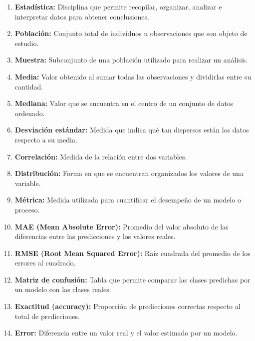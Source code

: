 \begin{enumerate}
  \item \textbf{Estadística:} Disciplina que permite recopilar, organizar, analizar e interpretar datos para obtener conclusiones.
  \item \textbf{Población:} Conjunto total de individuos u observaciones que son objeto de estudio.
  \item \textbf{Muestra:} Subconjunto de una población utilizado para realizar un análisis.
  \item \textbf{Media:} Valor obtenido al sumar todas las observaciones y dividirlas entre su cantidad.
  \item \textbf{Mediana:} Valor que se encuentra en el centro de un conjunto de datos ordenado.
  \item \textbf{Desviación estándar:} Medida que indica qué tan dispersos están los datos respecto a su media.
  \item \textbf{Correlación:} Medida de la relación entre dos variables.
  \item \textbf{Distribución:} Forma en que se encuentran organizados los valores de una variable.
  \item \textbf{Métrica:} Medida utilizada para cuantificar el desempeño de un modelo o proceso.
  \item \textbf{MAE (Mean Absolute Error):} Promedio del valor absoluto de las diferencias entre las predicciones y los valores reales.
  \item \textbf{RMSE (Root Mean Squared Error):} Raíz cuadrada del promedio de los errores al cuadrado.
  \item \textbf{Matriz de confusión:} Tabla que permite comparar las clases predichas por un modelo con las clases reales.
  \item \textbf{Exactitud (accuracy):} Proporción de predicciones correctas respecto al total de predicciones.
  \item \textbf{Error:} Diferencia entre un valor real y el valor estimado por un modelo.
\end{enumerate}
